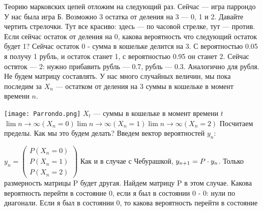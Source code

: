 Теорию марковских цепей отложим на следующий раз. Сейчас --- игра паррондо
У нас была игра Б. Возможно 3 остатка от деления на 3 --- 0, 1 и 2. Давайте чертить 
стрелочки. Тут все красиво: здесь --- по часовой стрелке, тут --- против.
Если сейчас остаток от деления на 0, какова вероятность что следующий остаток будет 1?
Сейчас остаток 0 - сумма в кошельке делится на 3. С вероятностью 0.05 я получу 1 рубль,
и остаток станет 1, с вероятностью 0.95 он станет 2. Сейчас оствток --- 2: нужно прибавить рубль --- 0.7, рубль --- 0.3. Аналогично для рубля. Не будем матрицу составлять. 
У нас много случайных величин, мы пока последим за $X_n$ --- остатком от деления на 3 суммы в кошельке в момент времени $n$. 

\texttt{[image:  Parrondo.png]}
$X_t$ --- суммы в кошельке в момент времени $t$
$\lim{n\to\infty}(X_n=0)
 \lim{n\to\infty}(X_n=1)
 \lim{n\to\infty}(X_n=2) $
 Посчитаем пределы. Как мы это будем делать? Введем вектор вероятностей $y_n$:

 $y_n=\left( \begin{array}{l}
		P(X_n=0)\\
		P(X_n=1)\\
		P(X_n=2)
		\end{array} \right) $
Как и в случае с Чебурашкой, $y_{n+1}=P\cdot y_n\\ $. Только размерность матрицы P будет другая. Найдем матрицу P в этом случае. 
Какова вероятность перейти в состояние 0, если я был в состоянии 0 - 0: нули по диагонали.
Если я был в состоянии 0, то какова вероятность перейти в состояние 

